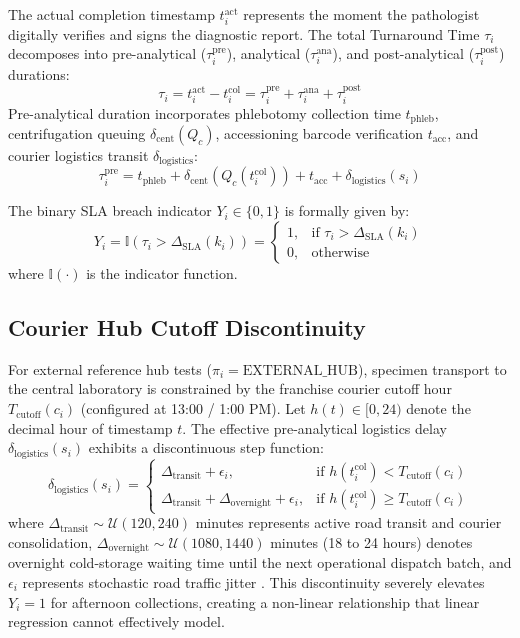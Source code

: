 \documentclass[conference]{IEEEtran}
\begin{document}
The actual completion timestamp $t_i^{\text{act}}$ represents the moment the pathologist digitally verifies and signs the diagnostic report. The total Turnaround Time $\tau_i$ decomposes into pre-analytical ($\tau_i^{\text{pre}}$), analytical ($\tau_i^{\text{ana}}$), and post-analytical ($\tau_i^{\text{post}}$) durations:
\begin{equation}
\tau_i = t_i^{\text{act}} - t_i^{\text{col}} = \tau_i^{\text{pre}} + \tau_i^{\text{ana}} + \tau_i^{\text{post}}
\end{equation}
Pre-analytical duration incorporates phlebotomy collection time $t_{\text{phleb}}$, centrifugation queuing $\delta_{\text{cent}}(Q_c)$, accessioning barcode verification $t_{\text{acc}}$, and courier logistics transit $\delta_{\text{logistics}}$:
\begin{equation}
\tau_i^{\text{pre}} = t_{\text{phleb}} + \delta_{\text{cent}}(Q_c(t_i^{\text{col}})) + t_{\text{acc}} + \delta_{\text{logistics}}(s_i)
\end{equation}

The binary SLA breach indicator $Y_i \in \{0, 1\}$ is formally given by:
\begin{equation}
Y_i = \mathbb{I}\left( \tau_i > \Delta_{\text{SLA}}(k_i) \right) = \begin{cases} 1, & \text{if } \tau_i > \Delta_{\text{SLA}}(k_i) \\ 0, & \text{otherwise} \end{cases}
\end{equation}
where $\mathbb{I}(\cdot)$ is the indicator function.

\subsection{Courier Hub Cutoff Discontinuity}
For external reference hub tests ($\pi_i = \text{EXTERNAL\_HUB}$), specimen transport to the central laboratory is constrained by the franchise courier cutoff hour $T_{\text{cutoff}}(c_i)$ (configured at 13:00 / 1:00 PM). Let $h(t) \in [0, 24)$ denote the decimal hour of timestamp $t$. The effective pre-analytical logistics delay $\delta_{\text{logistics}}(s_i)$ exhibits a discontinuous step function:
\begin{equation}
\delta_{\text{logistics}}(s_i) = \begin{cases}
\Delta_{\text{transit}} + \epsilon_i, & \text{if } h(t_i^{\text{col}}) < T_{\text{cutoff}}(c_i) \\
\Delta_{\text{transit}} + \Delta_{\text{overnight}} + \epsilon_i, & \text{if } h(t_i^{\text{col}}) \ge T_{\text{cutoff}}(c_i)
\end{cases}
\label{eq:courier_discontinuity}
\end{equation}
where $\Delta_{\text{transit}} \sim \mathcal{U}(120, 240)$ minutes represents active road transit and courier consolidation, $\Delta_{\text{overnight}} \sim \mathcal{U}(1080, 1440)$ minutes (18 to 24 hours) denotes overnight cold-storage waiting time until the next operational dispatch batch, and $\epsilon_i$ represents stochastic road traffic jitter \cite{daganzo1997fundamentals}. This discontinuity severely elevates $Y_i = 1$ for afternoon collections, creating a non-linear relationship that linear regression cannot effectively model.
\end{document}
